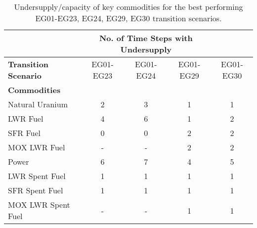 \begin{table}[]
	\centering
        \caption{Undersupply/capacity of key commodities for the best performing EG01-EG23, EG24, EG29, EG30 transition scenarios.}
		\label{tab:all-power-fin}
		\footnotesize
        \begin{tabular}{lcccc}
		\hline
		& \multicolumn{3}{c}{\textbf{No. of Time Steps with Undersupply}} \\ \hline
		\textbf{Transition Scenario} & EG01-EG23 & 
		EG01-EG24 & EG01-EG29 & EG01-EG30 \\ \hline 
		\textbf{Commodities} \\ 
		Natural Uranium		    & 2 	& 3  &  1  & 1 \\ 
		\gls{LWR} Fuel     	    & 4 	& 6  &  1  & 2\\ 
		\gls{SFR} Fuel     	    &  0 	& 0  &  2  & 2\\ 
		\gls{MOX} \gls{LWR} Fuel &-&-&2&2 \\
		Power      				&  6 	& 7  &  4 &  5\\ 
		\gls{LWR} Spent Fuel	& 1 	& 1  & 1 & 1\\ 
		\gls{SFR} Spent Fuel     	    &  1 	& 1  &  1  & 1\\ 
		\gls{MOX} \gls{LWR} Spent Fuel &-&-&1&1 \\ \hline 
	\end{tabular}
\end{table}

